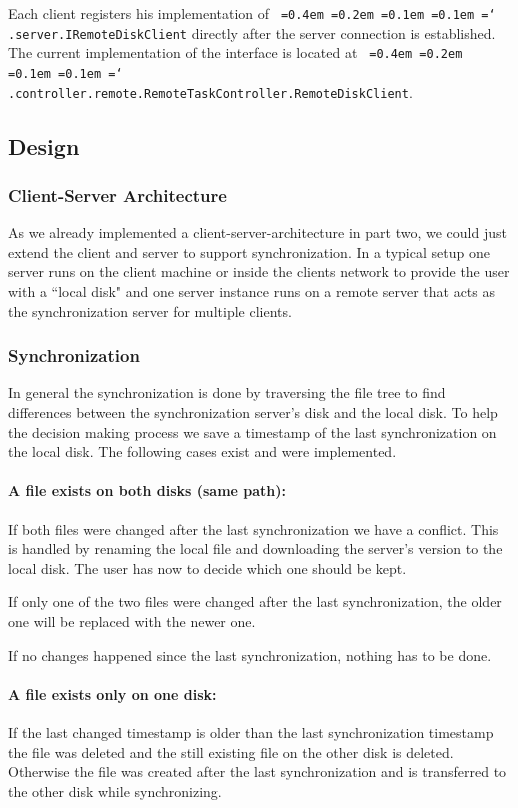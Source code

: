 \documentclass[a4paper,12pt]{article}
\newcommand*\justify{%
  \fontdimen2\font=0.4em%
  \fontdimen3\font=0.2em%
  \fontdimen4\font=0.1em%
  \fontdimen7\font=0.1em%
  \hyphenchar\font=`\-%
}
\newcommand{\mono}[1]{\texttt{\justify #1}}
\begin{document}
Each client registers his implementation of \mono{.server.IRemoteDiskClient} directly after the server connection is established. The current implementation of the interface is located at \mono{.controller.remote.RemoteTaskController.RemoteDiskClient}.

\subsection{Design}

\subsubsection{Client-Server Architecture}
As we already implemented a client-server-architecture in part two, we could just extend the client and server to support synchronization. In a typical setup one server runs on the client machine or inside the clients network to provide the user with a ``local disk" and one server instance runs on a remote server that acts as the synchronization server for multiple clients.

\subsubsection{Synchronization}
In general the synchronization is done by traversing the file tree to find differences between the synchronization server's disk and the local disk. To help the decision making process we save a timestamp of the last synchronization on the local disk. The following cases exist and were implemented.

\paragraph{A file exists on both disks (same path):} If both files were changed after the last synchronization we have a conflict. This is handled by renaming the local file and downloading the server's version to the local disk. The user has now to decide which one should be kept.

If only one of the two files were changed after the last synchronization, the older one will be replaced with the newer one.

If no changes happened since the last synchronization, nothing has to be done.

\paragraph{A file exists only on one disk:} If the last changed timestamp is older than the last synchronization timestamp the file was deleted and the still existing file on the other disk is deleted. Otherwise the file was created after the last synchronization and is transferred to the other disk while synchronizing.
\end{document}
